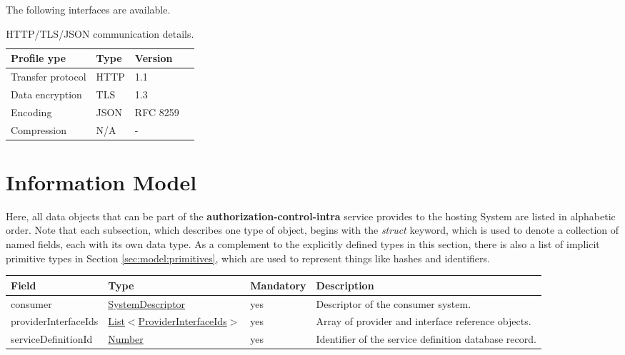 \documentclass[a4paper]{arrowhead}
\newcommand{\pref}[1]{{\textcolor{ArrowheadGrey}{\hyperref[sec:model:primitives:#1]{#1}}}}
\begin{document}
The following interfaces are available.


\begin{table}[ht!]
  \centering
  \begin{tabular}{|l|l|l|l|}
    \rowcolor{gray!33} Profile ype & Type & Version \\ \hline
    Transfer protocol & HTTP & 1.1 \\ \hline
    Data encryption & TLS & 1.3 \\ \hline
    Encoding & JSON & RFC 8259 \cite{rfc8259} \\ \hline
    Compression & N/A & - \\ \hline
  \end{tabular}
  \caption{HTTP/TLS/JSON communication details.}
  \label{tab:comunication_semantics_profile}
\end{table}

\clearpage

\section{Information Model}
\label{sec:model}

Here, all data objects that can be part of the \textbf{authorization-control-intra} service
provides to the hosting System are listed in alphabetic order.
Note that each subsection, which describes one type of object, begins with the \textit{struct} keyword, which is used to denote a collection of named fields, each with its own data type.
As a complement to the explicitly defined types in this section, there is also a list of implicit primitive types in Section \ref{sec:model:primitives}, which are used to represent things like hashes and identifiers.

\label{sec:model:CheckAuthRuleRequest}
 
\begin{table}[ht!]
\begin{tabularx}{\textwidth}{| p{3cm} | p{5cm} | p{2cm} | X |} \hline
\rowcolor{gray!33} Field & Type & Mandatory & Description \\ \hline
consumer & \hyperref[sec:model:SystemDescriptor]{SystemDescriptor} & yes & Descriptor of the consumer system. \\ \hline
providerInterfaceIds & \pref{List}$<$\hyperref[sec:model:ProviderInterfaceIds]{ProviderInterfaceIds}$>$ & yes & Array of provider and interface reference objects. \\ \hline
serviceDefinitionId &\pref{Number} & yes & Identifier of the service definition database record. \\ \hline
\end{tabularx}
\end{table}
\end{document}
